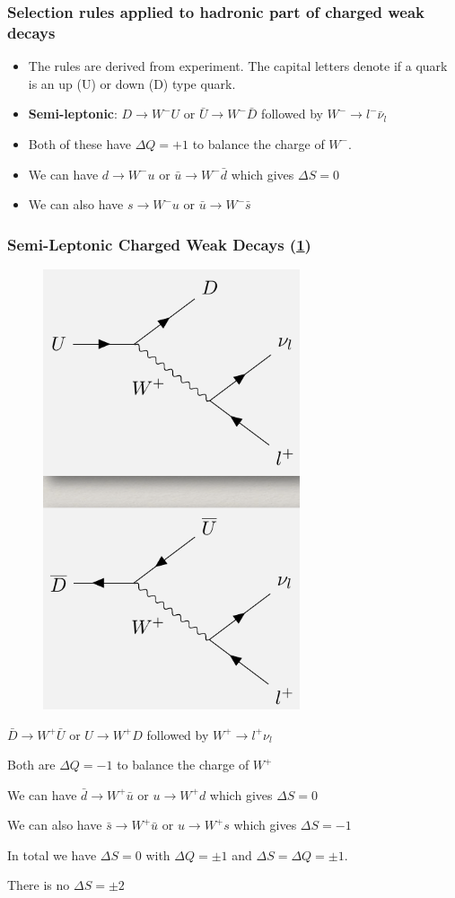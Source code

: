 \subsubsection{Selection rules applied to hadronic part of charged weak decays}
\begin{itemize}
    \item The rules are derived from experiment. The capital letters denote if a quark is an up (U) or down (D) type quark. 
    \item \textbf{Semi-leptonic}: $D → W^{-} U$ or $\bar{U} → W^{-} \bar{D}$ followed by $W^{-} →  l^{-} \bar{ν}_l$
    \item Both of these have $ΔQ = +1$ to balance the charge of $W^{-}$. 
    \item We can have $d → W^{-} u$ or $\bar{u} → W^{-} \bar{d}$ which gives $ΔS = 0$
    \item We can also have $s → W^{-}u$ or $\bar{u} →  W^{-} \bar{s}$
\end{itemize}

\subsubsection{Semi-Leptonic Charged Weak Decays (\cref{fig: semi-leptonic_charged_weak_decays})} 
\begin{itemize}
    \parbox[t]{\dimexpr\textwidth-\leftmargin}{
    \vspace{-7.5mm}
    \begin{figure}
    \vspace{-5mm}
    \centering
    \includegraphics[width = .25\textwidth]{semi-leptonic_charged_weak_decays.png}
    \caption{}
    \label{fig: semi-leptonic_charged_weak_decays}
  \end{figure}
  
  \item $\bar{D} → W^{+} \bar{U}$ or $U → W^{+} D$ followed by $W^{+} → l^{+} ν_l$
  \item Both are $ΔQ = -1$ to balance the charge of $W^{+}$
  \item We can have $\bar{d} → W^{+} \bar{u}$ or $u → W^{+} d$ which gives $ΔS = 0$
  \item We can also have $\bar{s} → W^{+} \bar{u}$ or $u → W^{+} s$ which gives $ΔS = -1$
  \item In total we have $ΔS = 0$ with $ΔQ = ±1$ and $ΔS = ΔQ = ±1$. 
    \item There is no $ΔS = ±2$    
    }
  \end{itemize}
  
